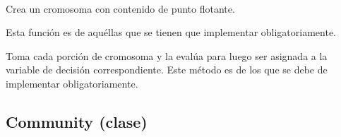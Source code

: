 \documentclass[letterpaper,10pt,english]{sphinxmanual}
\begin{document}
\begin{fulllineitems}
\label{Model/ChromosomalRepresentation/FloatPointRepresentation:Model.ChromosomalRepresentation.FloatPointRepresentation.create_chromosome}~
\begin{DUlineblock}{0em}
\item[] Crea un cromosoma con contenido de punto flotante.
\item[] Esta función es de aquéllas que se tienen que implementar obligatoriamente.
\end{DUlineblock}

\end{fulllineitems}


\begin{fulllineitems}
\label{Model/ChromosomalRepresentation/FloatPointRepresentation:Model.ChromosomalRepresentation.FloatPointRepresentation.evaluate_subchromosomes}
Toma cada porción de cromosoma y la evalúa para luego ser asignada
a la variable de decisión correspondiente. Este método es de los que se
debe de implementar obligatoriamente.

\end{fulllineitems}



\subsection{Community (clase)}
\label{Model/Community/Community:module-Model.Community.Community}\label{Model/Community/Community:community-clase}\label{Model/Community/Community::doc}
\end{document}
